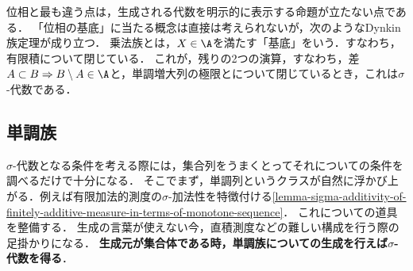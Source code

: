 \documentclass[uplatex, dvipdfmx]{jsreport}
\begin{document}
\begin{tcolorbox}[colframe=ForestGreen, colback=ForestGreen!10!white,breakable,colbacktitle=ForestGreen!40!white,coltitle=black,fonttitle=\bfseries\sffamily,
title=]
    位相と最も違う点は，生成される代数を明示的に表示する命題が立たない点である．
    「位相の基底」に当たる概念は直接は考えられないが，次のようなDynkin族定理が成り立つ．
    乗法族とは，$X\in\A$を満たす「基底」をいう．すなわち，有限積について閉じている．
    これが，残りの2つの演算，すなわち，差$A\subset B\Rightarrow B\setminus A\in\A$と，単調増大列の極限とについて閉じているとき，これは$\sigma$-代数である．
\end{tcolorbox}

\subsection{単調族}

\begin{tcolorbox}[colframe=ForestGreen, colback=ForestGreen!10!white,breakable,colbacktitle=ForestGreen!40!white,coltitle=black,fonttitle=\bfseries\sffamily,
title=単調族でもある代数は$\sigma$-代数である]
    $\sigma$-代数となる条件を考える際には，集合列をうまくとってそれについての条件を調べるだけで十分になる．
    そこでまず，単調列というクラスが自然に浮かび上がる．例えば有限加法的測度の$\sigma$-加法性を特徴付ける\ref{lemma-sigma-additivity-of-finitely-additive-measure-in-terms-of-monotone-sequence}．
    これについての道具を整備する．
    生成の言葉が使えない今，直積測度などの難しい構成を行う際の足掛かりになる．
    \textbf{生成元が集合体である時，単調族についての生成を行えば$\sigma$-代数を得る}．
\end{tcolorbox}
\end{document}
